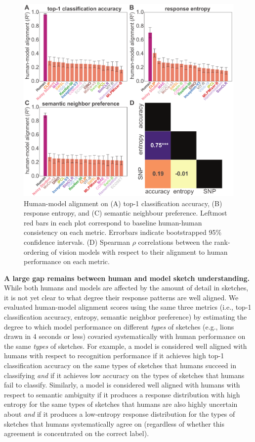 \documentclass{article}
\begin{document}
\begin{figure}[htp!]
    \centering
    \includegraphics[width=.8\textwidth]{neurips_figures/neurips_reliability_edited_2x2.pdf}
    \caption{Human-model alignment on (A) top-1 classification accuracy, (B) response entropy, and (C) semantic neighbour preference. Leftmost red bars in each plot correspond to baseline human-human consistency on each metric. Errorbars indicate bootstrapped 95\% confidence intervals. (D) Spearman $\rho$ correlations between the rank-ordering of vision models with respect to their alignment to human performance on each metric.}
    \label{fig:alignment}
    \vspace{-1em}
\end{figure}
\textbf{A large gap remains between human and model sketch understanding.}
While both humans and models are affected by the amount of detail in sketches, it is not yet clear to what degree their response patterns are well aligned. 
We evaluated human-model alignment scores using the same three metrics (i.e., top-1 classification accuracy, entropy, semantic neighbor preference) by estimating the degree to which model performance on different \textit{types} of sketches (e.g., lions drawn in 4 seconds or less) covaried systematically with human performance on the same \textit{types} of sketches. 
For example, a model is considered well aligned with humans with respect to recognition performance if it achieves high top-1 classification accuracy on the same types of sketches that humans succeed in classifying \textit{and} if it achieves low accuracy on the types of sketches that humans fail to classify. 
Similarly, a model is considered well aligned with humans with respect to semantic ambiguity if it produces a response distribution with high entropy for the same types of sketches that humans are also highly uncertain about \textit{and} if it produces a low-entropy response distribution for the types of sketches that humans systematically agree on (regardless of whether this agreement is concentrated on the correct label).
\end{document}
